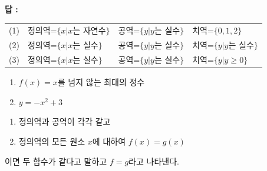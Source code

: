 \documentclass{oblivoir}
\begin{document}
{\noindent\textbf{답 :}
\footnotesize
\begin{tabu}[t]{X[0.2]@{}X[1.1]XX}
(1)	&정의역=$\{x\vert x\text{는 자연수}\}$	&공역=$\{y\vert y\text{는 실수}\}$	&치역=\(\{0,1,2\}\)\\
(2)	&정의역=$\{x\vert x\text{는 실수}\}$	&공역=$\{y\vert y\text{는 실수}\}$	&치역=$\{y\vert y\text{는 실수}\}$\\
(3)	&정의역=$\{x\vert x\text{는 실수}\}$	&공역=$\{y\vert y\text{는 실수}\}$	&치역=$\{y\vert y\ge0\}$
\end{tabu}
}

%
\begin{enumerate}\label{function7}
\item
\(f(x)=x\text{를 넘지 않는 최대의 정수}\)
\item
\(y=-x^2+3\)
\end{enumerate}

\newpage
\begin{mdframed}
%
\begin{enumerate}\label{function8}
\item
정의역과 공역이 각각 같고
\item
정의역의 모든 원소 \(x\)에 대하여 \(f(x)=g(x)\)
\end{enumerate}
이면 두 함수가 같다고 말하고 \(f=g\)라고 나타낸다.
\end{mdframed}

\end{document}
